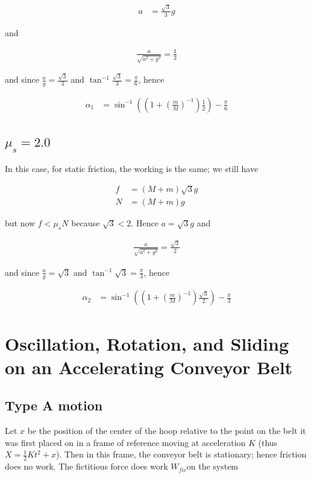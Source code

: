 \documentclass{article}
\newcommand{\half}{\frac{1}{2}}
\begin{document}
\begin{align*}
a &= \frac{\sqrt 3}{3}g
\end{align*}

and

\begin{align*}
\frac{a}{\sqrt{a^2 + g^2}} = \half
\end{align*}

and since $\frac{a}{g} = \frac{\sqrt 3}{3}$ and $\tan^{-1} \frac{\sqrt 3}{3} = \frac{\pi}{6}$, hence

\begin{align*}
\alpha_1 &= \sin^{-1}((1 + (\frac{m}{M})^{-1}) \half) - \frac{\pi}{6}
\end{align*}

\subsection{$\mu_s = 2.0$}

In this case, for static friction, the working is the same; we still have

\begin{align*}
f &= (M+m)\sqrt{3}g \\
N &= (M+m)g
\end{align*}

but now $f < \mu_s N$ because $\sqrt 3 < 2$. Hence $a = \sqrt{3}g$ and

\begin{align*}
\frac{a}{\sqrt{a^2 + g^2}} = \frac{\sqrt{3}}{2}
\end{align*}

and since $\frac{a}{g} = \sqrt{3}$ and $\tan^{-1} \sqrt 3 = \frac{\pi}{3}$, hence

\begin{align*}
\alpha_2 &= \sin^{-1}((1 + (\frac{m}{M})^{-1}) \frac{\sqrt{3}}{2}) - \frac{\pi}{3}
\end{align*}

\section{Oscillation, Rotation, and Sliding on an Accelerating Conveyor Belt}

\subsection{Type A motion}

Let $x$ be the position of the center of the hoop relative to the point on the belt it was first placed on in a frame of reference moving at acceleration $K$ (thus $X = \half Kt^2 + x$). Then in this frame, the conveyor belt is stationary; hence friction does no work. The fictitious force does work $W_{fic}$on the system
\end{document}
